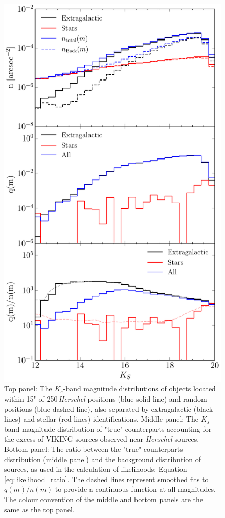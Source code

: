 \begin{figure}
    \centering
	\includegraphics[height=0.75\textheight]{Figures/true_counterparts_distribution.pdf}
	\caption{Top panel: The $K_s$-band magnitude distributions of objects located within 15" of 250\,\micron \textit{Herschel} positions (blue solid line) and random positions (blue dashed line), also separated by extragalactic (black lines) and stellar (red lines) identifications. Middle panel: The $K_s$-band magnitude distribution of "true" counterparts accounting for the excess of VIKING sources observed near \textit{Herschel} sources. Bottom panel: The ratio between the "true" counterparts distribution (middle panel) and the background distribution of sources, as used in the calculation of likelihoods; Equation \ref{eq:likelihood_ratio}. The dashed lines represent smoothed fits to $q(m)/n(m)$ to provide a continuous function at all magnitudes. The colour convention of the middle and bottom panels are the same as the top panel.}
	\label{fig:true_counterparts_distribution}
\end{figure}

